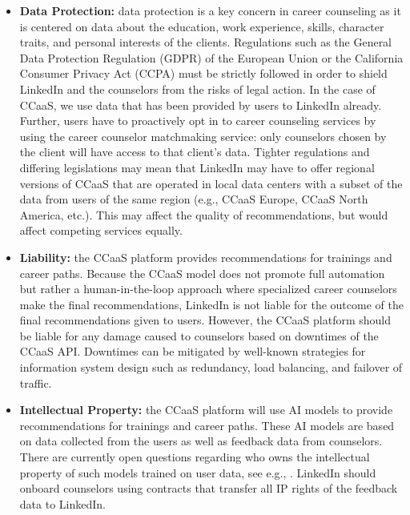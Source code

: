 \begin{itemize}
    \item \textbf{Data Protection:} data protection is a key concern in career counseling as it is 
        centered on data about the education, work experience, skills, character traits, and personal 
        interests of the clients. Regulations such as the General Data Protection Regulation (GDPR) of
        the European Union \citep{europeanparliamentRegulationEU20162016} or the California Consumer
        Privacy Act (CCPA) \citep{californiastatelegislatureTitle81California2018} must be strictly followed
        in order to shield LinkedIn and the counselors from the risks of legal action. In the case of 
        CCaaS, we use data that has been provided by users to LinkedIn already. Further, users have to
        proactively opt in to career counseling services by using the career counselor matchmaking service:
        only counselors chosen by the client will have access to that client's data.
        Tighter regulations and differing legislations may mean that LinkedIn may have to offer regional
        versions of CCaaS that are operated in local data centers with a subset of the data from users of
        the same region (e.g., CCaaS Europe, CCaaS North America, etc.). This may affect the quality of 
        recommendations, but would affect competing services equally.
    \item \textbf{Liability:} the CCaaS platform provides recommendations for trainings and career
        paths. Because the CCaaS model does not promote full automation but rather a human-in-the-loop
        approach where specialized career counselors make the final recommendations, LinkedIn is not 
        liable for the outcome of the final recommendations given to users. However, the CCaaS platform
        should be liable for any damage caused to counselors based on downtimes of the CCaaS API. Downtimes 
        can be mitigated by well-known strategies for information system design such as redundancy, load
        balancing, and failover of traffic.
    \item \textbf{Intellectual Property:} the CCaaS platform will use AI models to provide
        recommendations for trainings and career paths. These AI models are based on data collected
        from the users as well as feedback data from counselors. There are currently open questions
        regarding who owns the intellectual property of such models trained on user data, see e.g.,
        \citep{anwerIPChallengesDatafueled2021}. LinkedIn should onboard counselors using contracts 
        that transfer all IP rights of the feedback data to LinkedIn.
\end{itemize}


